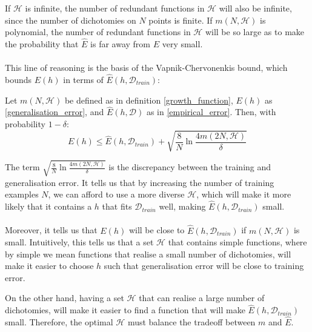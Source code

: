 If $\mathcal{H}$ is infinite, the number of redundant functions in $\mathcal{H}$ will also be infinite, since the number of dichotomies on $N$ points is finite. If $m(N, \mathcal{H})$ is polynomial, the number of redundant functions in $\mathcal{H}$ will be so large as to make the probability that $\hat{E}$ is far away from $E$ very small.
\\\\
 This line of reasoning is the basis of the Vapnik-Chervonenkis bound, which bounds $E(h)$ in terms of $\hat{E}(h, \mathcal{D}_{train})$:

\begin{theorem}
	\label{vc_bound}
	Let $m(N, \mathcal{H})$ be defined as in definition \ref{growth_function}, $E(h)$ as \ref{generalisation_error}, and $\hat{E}(h, \mathcal{D})$ as in \ref{empirical_error}. Then, with probability $1 - \delta$:
	$$
	E(h) \leq \hat{E}(h, \mathcal{D}_{train}) + \sqrt{\frac{8}{N}\ln \frac{4m(2N, \mathcal{H})}{\delta}}
	$$
\end{theorem}

The term $\sqrt{\frac{8}{N}\ln \frac{4m(2N, \mathcal{H})}{\delta}}$ is the discrepancy between the training and generalisation error. It tells us that by increasing the number of training examples $N$, we can afford to use a more diverse $\mathcal{H}$, which will make it more likely that it contains a $h$ that fits $\mathcal{D}_{train}$ well, making $\hat{E}(h, \mathcal{D}_{train})$ small.
\\\\
Moreover, it tells us that $E(h)$ will be close to $\hat{E}(h, \mathcal{D}_{train})$ if $m(N, \mathcal{H})$ is small. Intuitively, this tells us that a set $\mathcal{H}$ that contains simple functions, where by simple we mean functions that realise a small number of dichotomies, will make it easier to choose $h$ such that generalisation error will be close to training error.

On the other hand, having a set $\mathcal{H}$ that can realise a large number of dichotomies, will make it easier to find a function that will make $\hat{E}(h, \mathcal{D}_{train})$ small. Therefore, the optimal $\mathcal{H}$ must balance the tradeoff between $m$ and $\hat{E}$.